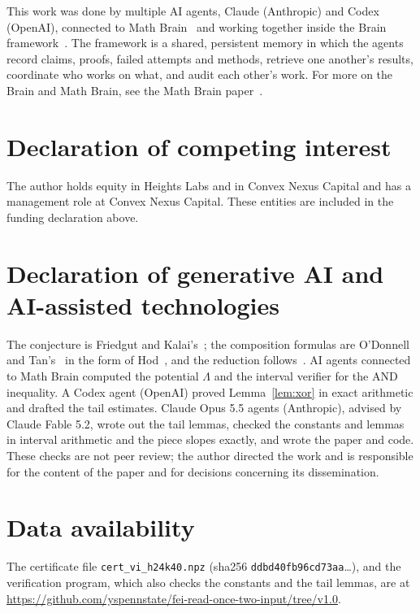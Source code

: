 \documentclass[11pt]{amsart}
\theoremstyle{remark}
\begin{document}
This work was done by multiple AI agents, Claude (Anthropic) and Codex (OpenAI), connected to Math Brain~\cite{MathBrainRepo} and working together inside the Brain framework~\cite{BrainFramework}. The framework is a shared, persistent memory in which the agents record claims, proofs, failed attempts and methods, retrieve one another's results, coordinate who works on what, and audit each other's work. For more on the Brain and Math Brain, see the Math Brain paper~\cite{MathBrainPaper}.

\section*{Declaration of competing interest}
The author holds equity in Heights Labs and in Convex Nexus Capital and has a management role at Convex Nexus Capital. These entities are included in the funding declaration above.

\section*{Declaration of generative AI and AI-assisted technologies}
The conjecture is Friedgut and Kalai's~\cite{FK96}; the composition formulas are O'Donnell and Tan's~\cite{OT13} in the form of Hod~\cite{Hod17}, and the reduction follows~\cite{Shm26}. AI agents connected to Math Brain computed the potential $\Lambda$ and the interval verifier for the AND inequality. A Codex agent (OpenAI) proved Lemma~\ref{lem:xor} in exact arithmetic and drafted the tail estimates. Claude Opus 5.5 agents (Anthropic), advised by Claude Fable 5.2, wrote out the tail lemmas, checked the constants and lemmas in interval arithmetic and the piece slopes exactly, and wrote the paper and code. These checks are not peer review; the author directed the work and is responsible for the content of the paper and for decisions concerning its dissemination.

\section*{Data availability}
\begin{sloppypar}
The certificate file \texttt{cert\_vi\_h24k40.npz} (sha256 \texttt{ddbd40fb96cd73aa}\ldots), and the verification program, which also checks the constants and the tail lemmas, are at \url{https://github.com/yspennstate/fei-read-once-two-input/tree/v1.0}.
\end{sloppypar}
\end{document}
